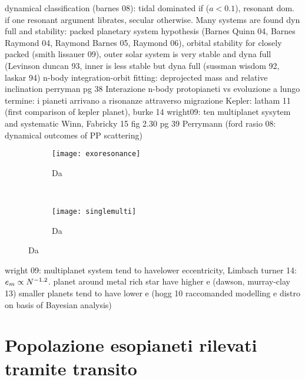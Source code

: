 \begin{workout}
dynamical classification (barnes 08): tidal dominated if ($a<0.1$), resonant dom. if one resonant argument librates, secular otherwise.
Many systems are found dyn full and stability: packed planetary system hypothesis (Barnes Quinn 04, Barnes Raymond 04, Raymond Barnes 05, Raymond 06), orbital stability for closely packed (smith lissauer 09), outer solar system is very stable and dyna full (Levinson duncan 93, inner is less stable but dyna full (sussman wisdom 92, laskar 94)
n-body integration-orbit fitting: deprojected mass and relative inclination
perryman pg 38
Interazione n-body protopianeti vs evoluzione a lungo termine: i pianeti arrivano a risonanze attraverso migrazione
Kepler: latham 11 (first comparison of kepler planet), burke 14
wright09: ten multiplanet sysytem and systematic
Winn, Fabricky 15
fig 2.30 pg 39 Perrymann
(ford rasio 08: dynamical outcomes of PP scattering)

\begin{figure}[!ht]
\begin{subfigure}[b]{0.47\textwidth}
\centering
\texttt{[image: exoresonance]}
\caption{Da \cite{winnfabrycky15}}\label{fig:exoresonance}
\end{subfigure}
~
\begin{subfigure}[b]{0.47\textwidth}
\centering
\texttt{[image: singlemulti]}\label{fig:}
\caption{Da \cite{wright09}}
\end{subfigure}
\end{figure}
\end{workout}

\begin{workout}
wright 09: multiplanet system tend to havelower eccentricity,
Limbach turner 14: $e_m\propto N^{-1.2}$.
planet around metal rich star have higher e (dawson, murray-clay 13)
smaller planets tend to have lower e (hogg 10 raccomanded modelling e distro on basis of Bayesian analysis)
\end{workout}

\clearpage

\section{Popolazione esopianeti rilevati tramite transito}

